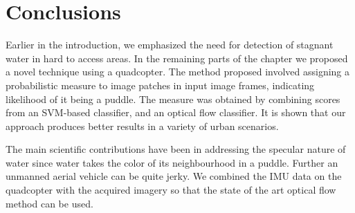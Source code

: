 \section{Conclusions}

Earlier in the introduction, we emphasized the need for detection of
stagnant water in hard to access areas. In the remaining parts of the
chapter we proposed a novel technique using a quadcopter.
The method proposed involved assigning a probabilistic measure to
image patches in input image frames, indicating likelihood of it being
a puddle. The measure was obtained by combining scores from an
SVM-based classifier, and an optical flow classifier. It is shown that
our approach produces better results in a variety of urban scenarios.

The main scientific contributions have been in addressing the specular
nature of water since water takes the color of its neighbourhood in a
puddle. Further an unmanned aerial vehicle can be quite jerky.  We
combined the IMU data on the quadcopter with the acquired imagery so
that the state of the art optical flow method can be used. 